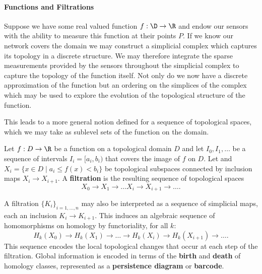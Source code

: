 
\paragraph*{\textbf{Functions and Filtrations}}


Suppose we have some real valued function $f:\D\to\R$ and endow our sensors with the ability to measure this function at their points $P$.
If we know our network covers the domain we may construct a simplicial complex which captures its topology in a discrete structure.
We may therefore integrate the sparse measurements provided by the sensors throughout the simplicial complex to capture the topology of the function itself.
Not only do we now have a discrete approximation of the function but an ordering on the simplices of the complex which may be used to explore the evolution of the topological structure of the function.

This leads to a more general notion defined for a sequence of topological spaces, which we may take as sublevel sets of the function on the domain.
\begin{definition}
    Let $f:D\to\R$ be a function on a topological domain $D$ and let $I_0, I_1,\ldots$ be a sequence of intervals $I_i = [a_i, b_i)$ that covers the image of $f$ on $D$.
    Let and $X_i = \{x\in D\mid a_i\leq f(x) < b_i\}$ be topological subspaces connected by inclusion maps $X_i\to X_{i+1}$.
    A \textbf{filtration} is the resulting sequence of topological spaces
    \[X_0\to X_1\to\ldots X_i\to X_{i+1}\to\ldots .\]
\end{definition}
A filtration $\{K_i\}_{i=1,\ldots,n}$ may also be interpreted as a sequence of simplicial maps, each an inclusion $K_i\to K_{i+1}$.
This induces an algebraic sequence of homomorphisms on homology by functoriality, for all $k$:
\[ H_k(X_0)\to H_k(X_1)\to\ldots\to H_k(X_i)\to H_k(X_{i+1})\to\ldots . \]
This sequence encodes the local topological changes that occur at each step of the filtration.
Global information is encoded in terms of the \textbf{birth} and \textbf{death} of homology classes, represented as a \textbf{persistence diagram} or \textbf{barcode}.
